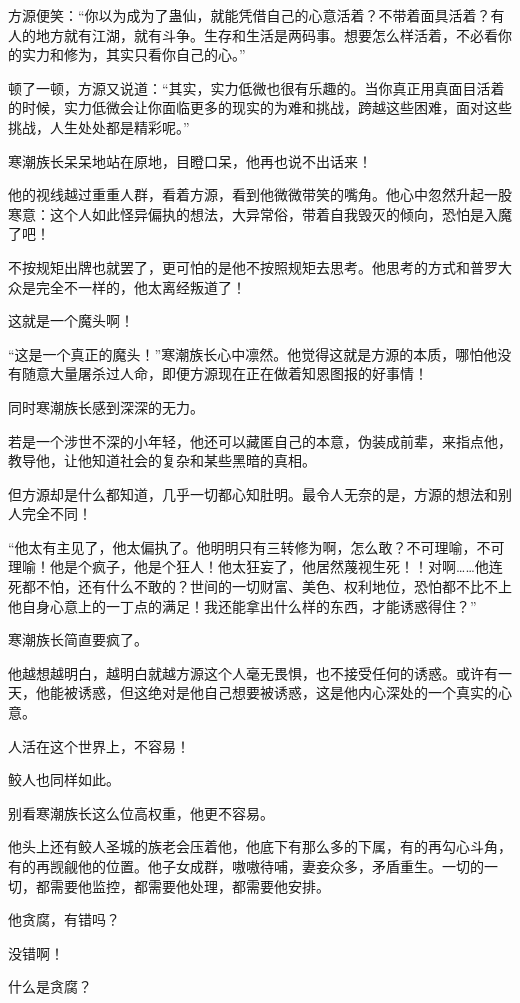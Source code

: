 \begin{this_body}
方源便笑：“你以为成为了蛊仙，就能凭借自己的心意活着？不带着面具活着？有人的地方就有江湖，就有斗争。生存和生活是两码事。想要怎么样活着，不必看你的实力和修为，其实只看你自己的心。”

顿了一顿，方源又说道：“其实，实力低微也很有乐趣的。当你真正用真面目活着的时候，实力低微会让你面临更多的现实的为难和挑战，跨越这些困难，面对这些挑战，人生处处都是精彩呢。”

寒潮族长呆呆地站在原地，目瞪口呆，他再也说不出话来！

他的视线越过重重人群，看着方源，看到他微微带笑的嘴角。他心中忽然升起一股寒意：这个人如此怪异偏执的想法，大异常俗，带着自我毁灭的倾向，恐怕是入魔了吧！

不按规矩出牌也就罢了，更可怕的是他不按照规矩去思考。他思考的方式和普罗大众是完全不一样的，他太离经叛道了！

这就是一个魔头啊！

“这是一个真正的魔头！”寒潮族长心中凛然。他觉得这就是方源的本质，哪怕他没有随意大量屠杀过人命，即便方源现在正在做着知恩图报的好事情！

同时寒潮族长感到深深的无力。

若是一个涉世不深的小年轻，他还可以藏匿自己的本意，伪装成前辈，来指点他，教导他，让他知道社会的复杂和某些黑暗的真相。

但方源却是什么都知道，几乎一切都心知肚明。最令人无奈的是，方源的想法和别人完全不同！

“他太有主见了，他太偏执了。他明明只有三转修为啊，怎么敢？不可理喻，不可理喻！他是个疯子，他是个狂人！他太狂妄了，他居然蔑视生死！！对啊……他连死都不怕，还有什么不敢的？世间的一切财富、美色、权利地位，恐怕都不比不上他自身心意上的一丁点的满足！我还能拿出什么样的东西，才能诱惑得住？”

寒潮族长简直要疯了。

他越想越明白，越明白就越方源这个人毫无畏惧，也不接受任何的诱惑。或许有一天，他能被诱惑，但这绝对是他自己想要被诱惑，这是他内心深处的一个真实的心意。

人活在这个世界上，不容易！

鲛人也同样如此。

别看寒潮族长这么位高权重，他更不容易。

他头上还有鲛人圣城的族老会压着他，他底下有那么多的下属，有的再勾心斗角，有的再觊觎他的位置。他子女成群，嗷嗷待哺，妻妾众多，矛盾重生。一切的一切，都需要他监控，都需要他处理，都需要他安排。

他贪腐，有错吗？

没错啊！

什么是贪腐？


\end{this_body}
